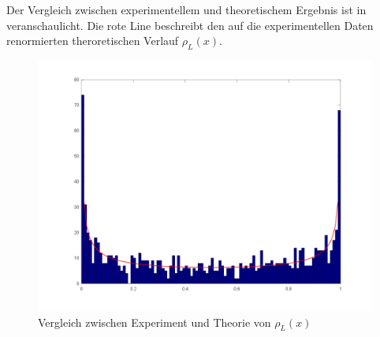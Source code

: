Der Vergleich zwischen experimentellem und theoretischem Ergebnis ist in 
veranschaulicht. Die rote Line beschreibt den auf die experimentellen Daten
renormierten theroretischen Verlauf $ρ_L(x)$.
\begin{figure}[htb]
\centering
  \includegraphics[width=1\columnwidth,keepaspectratio]{../logabb_r4.png}
  \caption{Vergleich zwischen Experiment und Theorie von $ρ_L(x)$}
  \label{fig:1b}
\end{figure}





